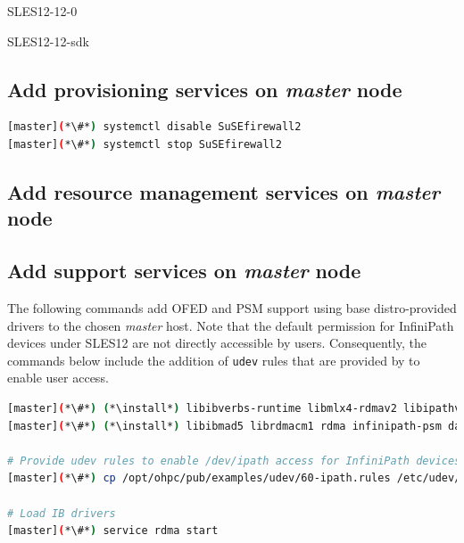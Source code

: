 \documentclass[letterpaper]{article}
\newcommand{\baseOS}{SLES12}
\newcommand{\install}{zypper -n install}
\begin{document}
\begin{itemize*}
\item SLES12-12-0
\item SLES12-12-sdk
\end{itemize*}



\subsection{Add provisioning services on {\em master} node} \label{sec:add_provisioning}



\begin{lstlisting}[language=bash,keywords={}]
[master](*\#*) systemctl disable SuSEfirewall2
[master](*\#*) systemctl stop SuSEfirewall2
\end{lstlisting}

\subsection{Add resource management services on {\em master} node} \label{sec:add_rm}


\subsection{Add \InfiniBand{} support services on {\em master} node} \label{sec:add_ofed}

The following commands add OFED and PSM support using base distro-provided drivers to the
chosen {\em master} host. Note that the default permission for InfiniPath
devices under \baseOS{} are not directly accessible by users. Consequently, the commands
below include the addition of \texttt{udev} rules that are provided by \OHPC{}
to enable user access.

\begin{lstlisting}[language=bash,keywords={}]
[master](*\#*) (*\install*) libibverbs-runtime libmlx4-rdmav2 libipathverbs-rdmav2
[master](*\#*) (*\install*) libibmad5 librdmacm1 rdma infinipath-psm dapl-devel dapl-utils 

# Provide udev rules to enable /dev/ipath access for InfiniPath devices
[master](*\#*) cp /opt/ohpc/pub/examples/udev/60-ipath.rules /etc/udev/rules.d/

# Load IB drivers
[master](*\#*) service rdma start
\end{lstlisting}
\end{document}
